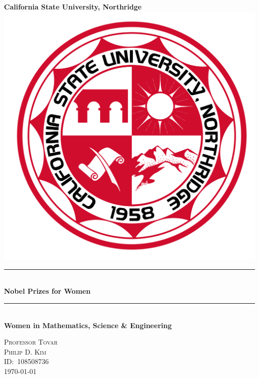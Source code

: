 \begin{titlepage}
  \newcommand{\HRule}{\rule{\linewidth}{0.5mm}}
  \center\Huge\textbf{California State University, Northridge}\\[2cm]
  \includegraphics[scale=0.1]{images/CSUNS.svg.png}\\[1cm]
  \HRule\  \\[0.4cm]
  {\huge\bfseries Nobel Prizes for Women}\\
  \HRule\  \\[0.4cm]
  \Large\textbf{Women in Mathematics, Science \& Engineering}\\[0.5cm]
  \vfill
  \begin{minipage}{0.4\textwidth}
  \large\centering\textsc{Professor Tovar}\\
  \textsc{Philip D. Kim}\\
  \textsc{ID:\ 108508736}\\
  \textsc{\today}
  \end{minipage}
\end{titlepage}